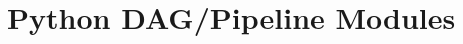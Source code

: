 
\chapter{Python DAG/Pipeline Modules}
\label{chapter:python}

\clearpage

\clearpage

\clearpage

\clearpage




